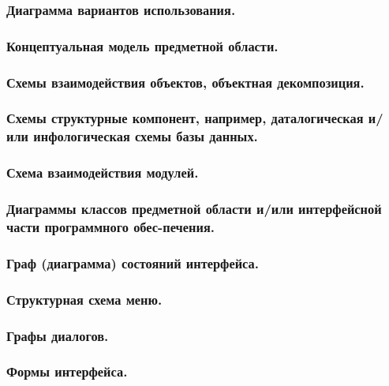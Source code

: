 \documentclass[utf8x, 12pt, oneside, a4paper]{article}
\begin{document}
	\subsubsection{\textbf{Диаграмма вариантов использования.}}

	\subsubsection{\textbf{Концептуальная модель предметной области.}}

	\subsubsection{\textbf{Схемы взаимодействия объектов, объектная декомпозиция.}}
	
	\subsubsection{\textbf{Схемы структурные компонент, например, даталогическая и/или инфологическая схемы базы данных.}}

	\subsubsection{\textbf{Схема взаимодействия модулей.}}

	\subsubsection{\textbf{Диаграммы классов предметной области и/или интерфейсной части программного обес-печения.}}

	\subsubsection{\textbf{Граф (диаграмма) состояний интерфейса.}}

	\subsubsection{\textbf{Структурная схема меню.}}

	\subsubsection{\textbf{Графы диалогов.}}
	\hfill
	\subsubsection{\textbf{Формы интерфейса.}}
\end{document}
